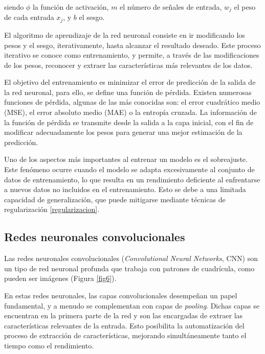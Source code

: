 siendo $\phi$ la función de activación, $m$ el número de señales de entrada, $w_j$ el peso de cada entrada $x_j$, y $b$ el sesgo.

El algoritmo de aprendizaje de la red neuronal consiste en ir modificando los pesos y el sesgo, iterativamente, hasta alcanzar el resultado deseado. Este proceso iterativo se conoce como entrenamiento, y permite, a través de las modificaciones de los pesos, reconocer y extraer las características más relevantes de los datos.

El objetivo del entrenamiento es minimizar el error de predicción de la salida de la red neuronal, para ello, se define una función de pérdida. Existen numerosas funciones de pérdida, algunas de las más conocidas son: el error cuadrático medio (MSE), el error absoluto medio (MAE) o la entropía cruzada. La información de la función de pérdida se transmite desde la salida a la capa inicial, con el fin de modificar adecuadamente los pesos para generar una mejor estimación de la predicción.

Uno de los aspectos más importantes al entrenar un modelo es el sobreajuste. Este fenómeno ocurre cuando el modelo se adapta excesivamente al conjunto de datos de entrenamiento, lo que resulta en un rendimiento deficiente al enfrentarse a nuevos datos no incluidos en el entrenamiento. Esto se debe a una limitada capacidad de generalización, que puede mitigarse mediante técnicas de regularización \ref{regularizacion}.


\subsection{Redes neuronales convolucionales}
Las redes neuronales convolucionales (\textit{Convolutional Neural Networks}, CNN) \cite{35, 36, 37} son un tipo de red neuronal profunda que trabaja con patrones de cuadrícula, como pueden ser imágenes (Figura \ref{fig6}).

En estas redes neuronales, las capas convolucionales desempeñan un papel fundamental, y a menudo se complementan con capas de \textit{pooling}. Dichas capas se encuentran en la primera parte de la red y son las encargadas de extraer las características relevantes de la entrada. Esto posibilita la automatización del proceso de extracción de características, mejorando simultáneamente tanto el tiempo como el rendimiento.

